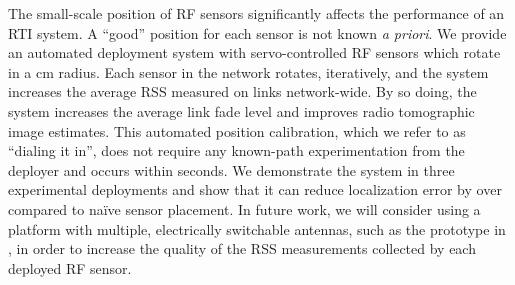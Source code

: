 \documentclass[conference]{IEEEtran}
\begin{document}
The small-scale position of RF sensors significantly affects the performance of an RTI system.  A ``good'' position for each sensor is not known \emph{a priori}.  We provide an automated deployment system with servo-controlled RF sensors which rotate in a  cm radius.  Each sensor in the network rotates, iteratively, and the system increases the average RSS measured on links network-wide.  By so doing, the system increases the average link fade level and improves radio tomographic image estimates.  This automated position calibration, which we refer to as ``dialing it in'', does not require any known-path experimentation from the deployer and occurs within seconds.  We demonstrate the system in three experimental deployments and show that it can reduce localization error by over  compared to na\"ive sensor placement. In future work, we will consider using a platform with multiple, electrically switchable antennas, such as the prototype in \cite{SPIDA_antenna}, in order to increase the quality of the RSS measurements collected by each deployed RF sensor. 
\end{document}
